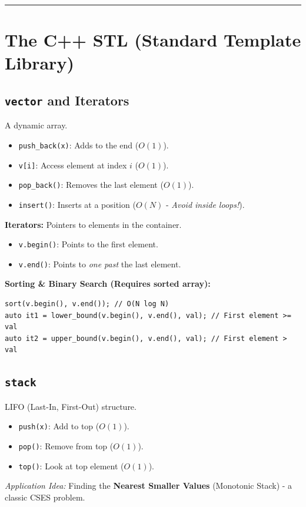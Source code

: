 \documentclass[12pt, a4paper]{article}
\begin{document}
\vspace{0.5cm}
\hrule
\vspace{0.5cm}

\section{The C++ STL (Standard Template Library)}

\subsection{\texttt{vector} and Iterators}
A dynamic array.
\begin{itemize}
    \item \texttt{push\_back(x)}: Adds to the end ($O(1)$).
    \item \texttt{v[i]}: Access element at index $i$ ($O(1)$).
    \item \texttt{pop\_back()}: Removes the last element ($O(1)$).
    \item \texttt{insert()}: Inserts at a position ($O(N)$ - \textit{Avoid inside loops!}).
\end{itemize}

\textbf{Iterators:} Pointers to elements in the container.
\begin{itemize}
    \item \texttt{v.begin()}: Points to the first element.
    \item \texttt{v.end()}: Points to \textit{one past} the last element.
\end{itemize}

\textbf{Sorting \& Binary Search (Requires sorted array):}
\begin{lstlisting}
sort(v.begin(), v.end()); // O(N log N)
auto it1 = lower_bound(v.begin(), v.end(), val); // First element >= val
auto it2 = upper_bound(v.begin(), v.end(), val); // First element > val
\end{lstlisting}


\subsection{\texttt{stack}}
LIFO (Last-In, First-Out) structure.
\begin{itemize}
    \item \texttt{push(x)}: Add to top ($O(1)$).
    \item \texttt{pop()}: Remove from top ($O(1)$).
    \item \texttt{top()}: Look at top element ($O(1)$).
\end{itemize}
\textit{Application Idea:} Finding the \textbf{Nearest Smaller Values} (Monotonic Stack) - a classic CSES problem.
\end{document}
